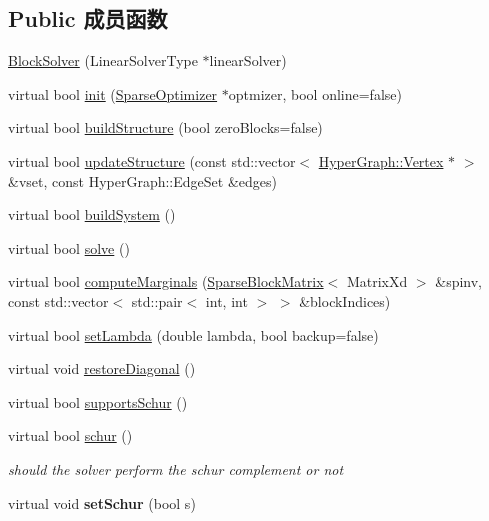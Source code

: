 \subsection*{Public 成员函数}
\begin{DoxyCompactItemize}
\item 
\hyperlink{classg2o_1_1BlockSolver_a04701a223a14708c9c84ce4d7e7af3f6}{Block\-Solver} (Linear\-Solver\-Type $\ast$linear\-Solver)
\item 
virtual bool \hyperlink{classg2o_1_1BlockSolver_a8bf01018abc3bfddfa3b29a380a1d6cb}{init} (\hyperlink{classg2o_1_1SparseOptimizer}{Sparse\-Optimizer} $\ast$optmizer, bool online=false)
\item 
virtual bool \hyperlink{classg2o_1_1BlockSolver_a17e4392d3cca9a9d7cf38bb46d073b86}{build\-Structure} (bool zero\-Blocks=false)
\item 
virtual bool \hyperlink{classg2o_1_1BlockSolver_acc497239c5e681ddec2140e34dfc5938}{update\-Structure} (const std\-::vector$<$ \hyperlink{classg2o_1_1HyperGraph_1_1Vertex}{Hyper\-Graph\-::\-Vertex} $\ast$ $>$ \&vset, const Hyper\-Graph\-::\-Edge\-Set \&edges)
\item 
virtual bool \hyperlink{classg2o_1_1BlockSolver_a2654a8d52f38e5ce23720a8de302e2e7}{build\-System} ()
\item 
virtual bool \hyperlink{classg2o_1_1BlockSolver_a589a75a131cce100c1945ad2786214d7}{solve} ()
\item 
virtual bool \hyperlink{classg2o_1_1BlockSolver_ac21cd7e2c9b8a1414f7a2dccb0d30a0e}{compute\-Marginals} (\hyperlink{classg2o_1_1SparseBlockMatrix}{Sparse\-Block\-Matrix}$<$ Matrix\-Xd $>$ \&spinv, const std\-::vector$<$ std\-::pair$<$ int, int $>$ $>$ \&block\-Indices)
\item 
virtual bool \hyperlink{classg2o_1_1BlockSolver_acc63a23e5b35e4f72d46dc22719aa56f}{set\-Lambda} (double lambda, bool backup=false)
\item 
virtual void \hyperlink{classg2o_1_1BlockSolver_a2136931d7aa2f54df5207556c4685809}{restore\-Diagonal} ()
\item 
virtual bool \hyperlink{classg2o_1_1BlockSolver_a68dc822ce48e80ceacce69c7bd029674}{supports\-Schur} ()
\item 
\hypertarget{classg2o_1_1BlockSolver_a382173946f1dd929a625e3708c959883}{virtual bool \hyperlink{classg2o_1_1BlockSolver_a382173946f1dd929a625e3708c959883}{schur} ()}\label{classg2o_1_1BlockSolver_a382173946f1dd929a625e3708c959883}

\begin{DoxyCompactList}\small\item\em should the solver perform the schur complement or not \end{DoxyCompactList}\item 
\hypertarget{classg2o_1_1BlockSolver_a6dd8e7e7a099410005cb96ff874d8866}{virtual void {\bfseries set\-Schur} (bool s)}\label{classg2o_1_1BlockSolver_a6dd8e7e7a099410005cb96ff874d8866}


\end{DoxyCompactItemize}
